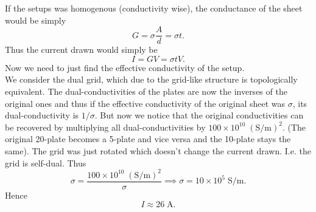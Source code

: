 \newpage
\begin{solution}
If the setups was homogenous (conductivity wise), the conductance of the sheet would be simply
\[G=\sigma\frac Ad=\sigma t.\]
Thus the current drawn would simply be
\[I=GV=\sigma tV.\]
Now we need to just find the effective conductivity of the setup.\\

We consider the dual grid, which due to the grid-like structure is topologically equivalent. The dual-conductivities of the plates are now the inverses of the original ones and thus if the effective conductivity of the original sheet was $\sigma$, its dual-conductivity is $1/\sigma.$ But now we notice that the original conductivities can be recovered by multiplying all dual-conductivities by $100\times 10^{10}\;(\mathrm{S/m})^2.$ (The original 20-plate becomes a 5-plate and vice versa and the 10-plate stays the same). The grid was just rotated which doesn't change the current drawn. I.e. the grid is self-dual. Thus 
\[\sigma=\frac{100\times 10^{10}\;(\mathrm{S/m})^2}{\sigma} \implies \sigma=10\times10^5\;\mathrm{S/m}.\]
Hence
\[I\approx \boxed{26\;\mathrm{A}.}\]

\end{solution}